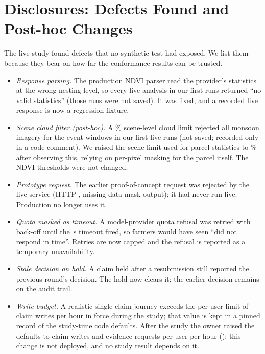 \documentclass[journal]{IEEEtran}
\begin{document}
\section{Disclosures: Defects Found and Post-hoc Changes}\label{sec:disclosures}
The live study found defects that no synthetic test had exposed. We list them because they bear on how far the conformance results can be trusted.
\begin{itemize}
\item \emph{Response parsing.} The production NDVI parser read the provider's statistics at the wrong nesting level, so every live analysis in our first runs returned ``no valid statistics'' (those runs were not saved). It was fixed, and a recorded live response is now a regression fixture.
\item \emph{Scene cloud filter (post-hoc).} A \SatSceneCloudMaxPercent\% scene-level cloud limit rejected all monsoon imagery for the event windows in our first live runs (not saved; recorded only in a code comment). We raised the scene limit used for parcel statistics to \SatProcessingSceneCloudMaxPercent\% after observing this, relying on per-pixel masking for the parcel itself. The NDVI thresholds were not changed.
\item \emph{Prototype request.} The earlier proof-of-concept request was rejected by the live service (HTTP \SatPocHttpStatus, missing data-mask output); it had never run live. Production no longer uses it.
\item \emph{Quota masked as timeout.} A model-provider quota refusal was retried with back-off until the \AiTimeoutSeconds\,s timeout fired, so farmers would have seen ``did not respond in time''. Retries are now capped and the refusal is reported as a temporary unavailability.
\item \emph{Stale decision on hold.} A claim held after a resubmission still reported the previous round's decision. The hold now clears it; the earlier decision remains on the audit trail.
\item \emph{Write budget.} A realistic single-claim journey exceeds the per-user limit of \ClaimWritesPerHourAtStudyWord{} claim writes per hour in force during the study; that value is kept in a pinned record of the study-time code defaults. After the study the owner raised the defaults to \ClaimWritesPerHourWord{} claim writes and \EvidenceRequestsPerHour{} evidence requests per user per hour (\PolicySafeAiDate{}); this change is not deployed, and no study result depends on it.
\end{itemize}
\end{document}
